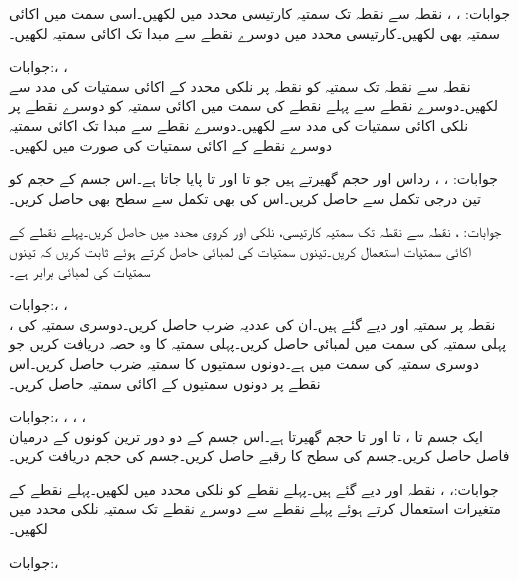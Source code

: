 جوابات: ، ، 
نقطہ  سے نقطہ  تک سمتیہ کارتیسی محدد میں لکھیں۔اسی سمت میں اکائی سمتیہ بھی لکھیں۔کارتیسی محدد میں دوسرے نقطے سے مبدا تک اکائی سمتیہ لکھیں۔

جوابات:، ، \\ 
نقطہ  سے نقطہ  تک سمتیہ کو نقطہ  پر نلکی محدد کے اکائی سمتیات کی مدد سے لکھیں۔دوسرے نقطے سے پہلے نقطے کی سمت میں اکائی سمتیہ کو دوسرے  نقطے پر نلکی اکائی سمتیات کی مدد سے لکھیں۔دوسرے نقطے سے مبدا تک اکائی سمتیہ دوسرے نقطے کے اکائی سمتیات کی صورت  میں لکھیں۔ 

جوابات: ، ،  
رداس  اور  حجم گھیرتے ہیں جو  تا  اور  تا  پایا جاتا ہے۔اس جسم کے حجم کو تین درجی تکمل سے حاصل کریں۔اس کی بھی تکمل سے سطح بھی حاصل کریں۔

جوابات: ، 
نقطہ  سے نقطہ  تک سمتیہ کارتیسی، نلکی اور کروی محدد میں حاصل کریں۔پہلے نقطے کے اکائی سمتیات استعمال کریں۔تینوں سمتیات کی لمبائی حاصل کرتے ہوئے ثابت کریں کہ تینوں سمتیات کی لمبائی برابر ہے۔

جوابات:، ، \\
 ، 
نقطہ  پر سمتیہ  اور  دیے گئے ہیں۔ان کی عددیہ ضرب  حاصل کریں۔دوسری سمتیہ کی پہلی سمتیہ کی سمت میں لمبائی حاصل کریں۔پہلی سمتیہ کا وہ حصہ دریافت کریں جو دوسری سمتیہ کی سمت میں ہے۔دونوں سمتیوں کا سمتیہ ضرب  حاصل کریں۔اس نقطے پر دونوں سمتیوں کے  اکائی سمتیہ حاصل کریں۔

جوابات:، ، ، ،\\ 
ایک جسم  تا ،  تا  اور  تا  حجم گھیرتا ہے۔اس جسم کے دو دور ترین کونوں کے درمیان فاصل حاصل کریں۔جسم کی سطح کا رقبے حاصل کریں۔جسم کی حجم دریافت کریں۔

جوابات:، ، 
نقطہ  اور  دیے گئے ہیں۔پہلے نقطے کو نلکی محدد میں لکھیں۔پہلے نقطے کے متغیرات استعمال کرتے ہوئے پہلے نقطے سے دوسرے نقطے تک سمتیہ نلکی محدد میں لکھیں۔

جوابات:، 
